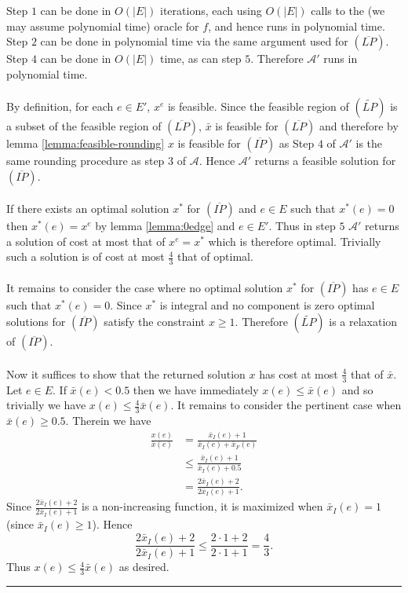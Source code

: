 \documentclass[letterpaper,12pt,oneside,onecolumn]{article}
\newcommand{\cA}{\mathcal{A}} \newcommand{\cB}{\mathcal{B}}
\newenvironment{proof}{{\bf Proof:  }}{\hfill\rule{2mm}{2mm}}
\begin{document}
\begin{proof}
Step $1$ can be done in $O(|E|)$ iterations, each using $O(|E|)$ calls to the (we may assume polynomial time) oracle for $f$, and hence runs in polynomial time. Step $2$ can be done in polynomial time via the same argument used for $(\overline{LP})$. Step $4$ can be done in $O(|E|)$ time, as can step $5$. Therefore $\cA'$ runs in polynomial time. 
\paragraph{}
By definition, for each $e \in E'$, $x^{e}$ is feasible. Since the feasible region of $(\tilde{LP})$ is a subset of the feasible region of $(\overline{LP})$, $\bar{x}$ is feasible for $(\overline{LP})$ and therefore by lemma \ref{lemma:feasible-rounding} $x$ is feasible for $(\overline{IP})$ as Step $4$ of $\cA'$ is the same rounding procedure as step $3$ of $\cA$. Hence $\cA'$ returns a feasible solution for $(\overline{IP})$.
\paragraph{}
If there exists an optimal solution $x^*$ for $(\overline{IP})$ and $e \in E$ such that $x^*(e) = 0$ then $x^*(e) = x^{e}$ by lemma \ref{lemma:0edge} and $e \in E'$. Thus in step $5$ $\cA'$ returns a solution of cost at most that of $x^{e} = x^*$ which is therefore optimal. Trivially such a solution is of cost at most $\frac{4}{3}$ that of optimal.
\paragraph{}
It remains to consider the case where no optimal solution $x^*$ for $(\overline{IP})$ has $e\in E$ such that $x^*(e) = 0$. Since $x^*$ is integral and no component is zero optimal solutions for $(\overline{IP})$ satisfy the constraint $x\geq 1$. Therefore $(\tilde{LP})$ is a relaxation of $(\overline{IP})$.
\paragraph{}
Now it suffices to show that the returned solution $x$ has cost at most $\frac{4}{3}$ that of $\bar{x}$. Let $e \in E$. If $\bar{x}(e) < 0.5$ then we have immediately $x(e) \leq \bar{x}(e)$ and so trivially we have $x(e) \leq \frac{4}{3}\bar{x}(e)$. It remains to consider the pertinent case when $\bar{x}(e) \geq 0.5$. Therein we have
\begin{align*}
\frac{x(e)}{\bar{x}(e)} &= \frac{\bar{x}_I(e) + 1}{\bar{x}_I(e) + \bar{x}_F(e)} \\
&\leq  \frac{\bar{x}_I(e) + 1}{\bar{x}_I(e) +0.5} \\
&= \frac{2\bar{x}_I(e) + 2}{2\bar{x}_I(e) + 1}.
\end{align*}
Since $\frac{2\bar{x}_I(e) + 2}{2\bar{x}_I(e) + 1}$ is a non-increasing function, it is maximized when $\bar{x}_I(e) = 1$ (since $\bar{x}_I(e) \geq 1$). Hence
$$\frac{2\bar{x}_I(e) + 2}{2\bar{x}_I(e) + 1} \leq \frac{2\cdot 1 + 2}{2\cdot 1 + 1} = \frac{4}{3}.$$
Thus $x(e) \leq \frac{4}{3}\bar{x}(e)$ as desired. 
\end{proof}
\end{document}
